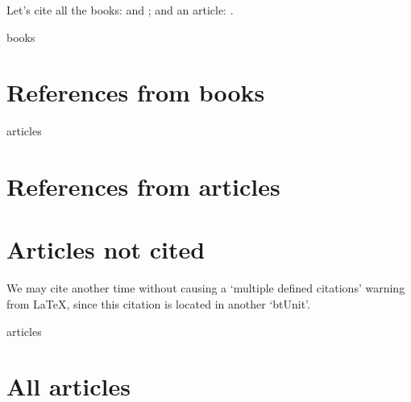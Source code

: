 
\begin{btUnit} %
Let’s cite all the books: \cite{ColBenh:93} and
\cite{Munt:93}; and an article: \cite{RouxSmart:95}.
\begin{btSect}{books}
\section{References from books}
\btPrintCited
\end{btSect}
\begin{btSect}[plain]{articles}
\section{References from articles}
\btPrintCited
\section{Articles not cited}
\btPrintNotCited
\end{btSect}
\end{btUnit} %
\begin{btUnit} %
We may cite \cite{RouxSmart:95} another time without causing a
‘multiple defined citations’ warning from \LaTeX, since this
citation is located in another ‘btUnit’.
\begin{btSect}{articles}
\section{All articles}
\btPrintAll
\end{btSect}
\end{btUnit} %
